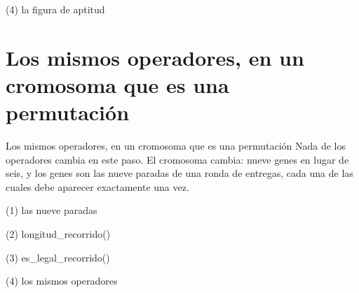 \begin{frame}[fragile]{(4) la figura de aptitud}

\end{frame}


\section{Los mismos operadores, en un cromosoma que es una permutación}

\begin{frame}{Los mismos operadores, en un cromosoma que es una permutación}
Nada de los operadores cambia en este paso. El cromosoma cambia: nueve genes
en lugar de seis, y los genes son las nueve paradas de una ronda de entregas,
cada una de las cuales debe aparecer exactamente una vez.
\end{frame}

\begin{frame}[fragile]{(1) las nueve paradas}

\end{frame}

\begin{frame}[fragile]{(2) longitud\_recorrido()}

\end{frame}

\begin{frame}[fragile]{(3) es\_legal\_recorrido()}

\end{frame}

\begin{frame}[fragile]{(4) los mismos operadores}

\end{frame}


